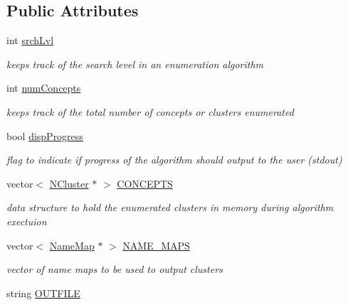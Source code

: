 \subsection*{Public Attributes}
\begin{DoxyCompactItemize}
\item 
int \hyperlink{class_lattice_algos_a7061dd2e2590fa24e0dfb16f28509dce}{srchLvl}
\begin{DoxyCompactList}\small\item\em keeps track of the search level in an enumeration algorithm \item\end{DoxyCompactList}\item 
int \hyperlink{class_lattice_algos_a8a6e4d766e7f93a288e015e93b3183a0}{numConcepts}
\begin{DoxyCompactList}\small\item\em keeps track of the total number of concepts or clusters enumerated \item\end{DoxyCompactList}\item 
bool \hyperlink{class_lattice_algos_a7c599d38a3a66b926d7345153ca2e93c}{dispProgress}
\begin{DoxyCompactList}\small\item\em flag to indicate if progress of the algorithm should output to the user (stdout) \item\end{DoxyCompactList}\item 
vector$<$ \hyperlink{class_n_cluster}{NCluster} $\ast$ $>$ \hyperlink{class_lattice_algos_a006fbb44cdb89ab949bc9f47ed20a6d3}{CONCEPTS}
\begin{DoxyCompactList}\small\item\em data structure to hold the enumerated clusters in memory during algorithm exectuion \item\end{DoxyCompactList}\item 
vector$<$ \hyperlink{class_name_map}{NameMap} $\ast$ $>$ \hyperlink{class_lattice_algos_a242b1f9b2ec58cec08c4c5c074c0c1e7}{NAME\_\-MAPS}
\begin{DoxyCompactList}\small\item\em vector of name maps to be used to output clusters \item\end{DoxyCompactList}\item 
string \hyperlink{class_lattice_algos_aaf79cc2e8513fd28bf1e9329c3e678ab}{OUTFILE}

\end{DoxyCompactItemize}
